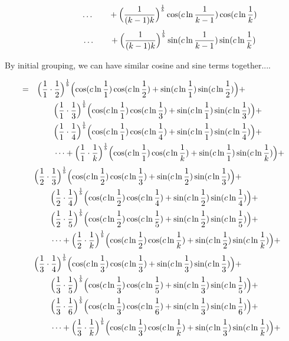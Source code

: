\documentclass{amsart}
\begin{document}
	\[ \qquad\qquad \dots \qquad + \Bigl( \frac{1}{(k-1)k} \Bigr)^\frac1b \cos(c \ln \frac{1}{k-1}) \cos(c \ln \frac{1}{k}) \]
	\[ \qquad\qquad \dots \qquad + \Bigl( \frac{1}{(k-1)k} \Bigr)^\frac1b \sin(c \ln \frac{1}{k-1}) \sin(c \ln \frac{1}{k}) \]
	
	By initial grouping, we can have similar cosine and sine terms together....
	
	\[
	\begin{aligned}
		= \quad & \Bigl( \frac{1}{1} \cdot \frac{1}{2} \Bigr)^\frac1b \Bigl( \cos(c \ln \frac{1}{1}) \cos(c \ln \frac{1}{2}) + \sin(c \ln \frac{1}{1}) \sin(c \ln \frac{1}{2}) \Bigr) + \\
		& \qquad \Bigl( \frac{1}{1} \cdot \frac{1}{3} \Bigr)^\frac1b \Bigl( \cos(c \ln \frac{1}{1}) \cos(c \ln \frac{1}{3}) + \sin(c \ln \frac{1}{1}) \sin(c \ln \frac{1}{3}) \Bigr) + \\
		& \qquad \Bigl( \frac{1}{1} \cdot \frac{1}{4} \Bigr)^\frac1b \Bigl( \cos(c \ln \frac{1}{1}) \cos(c \ln \frac{1}{4}) + \sin(c \ln \frac{1}{1}) \sin(c \ln \frac{1}{4}) \Bigr) + \\
		& \qquad \dots  + \Bigl( \frac{1}{1} \cdot \frac{1}{k} \Bigr)^\frac1b \Bigl( \cos(c \ln \frac{1}{1}) \cos(c \ln \frac{1}{k}) + \sin(c \ln \frac{1}{1}) \sin(c \ln \frac{1}{k}) \Bigr) + 
	\end{aligned}
	\]
	\[
	\begin{aligned}
		\quad & \Bigl( \frac{1}{2} \cdot \frac{1}{3} \Bigr)^\frac1b \Bigl( \cos(c \ln \frac{1}{2}) \cos(c \ln \frac{1}{3}) + \sin(c \ln \frac{1}{2}) \sin(c \ln \frac{1}{3}) \Bigr) + \\
		& \qquad \Bigl( \frac{1}{2} \cdot \frac{1}{4} \Bigr)^\frac1b \Bigl( \cos(c \ln \frac{1}{2}) \cos(c \ln \frac{1}{4}) + \sin(c \ln \frac{1}{2}) \sin(c \ln \frac{1}{4}) \Bigr) + \\
		& \qquad \Bigl( \frac{1}{2} \cdot \frac{1}{5} \Bigr)^\frac1b \Bigl( \cos(c \ln \frac{1}{2}) \cos(c \ln \frac{1}{5}) + \sin(c \ln \frac{1}{2}) \sin(c \ln \frac{1}{5}) \Bigr) + \\
		& \qquad \dots  + \Bigl( \frac{1}{2} \cdot \frac{1}{k} \Bigr)^\frac1b \Bigl( \cos(c \ln \frac{1}{2}) \cos(c \ln \frac{1}{k}) + \sin(c \ln \frac{1}{2}) \sin(c \ln \frac{1}{k}) \Bigr) + 
	\end{aligned}
	\]
	\[
	\begin{aligned}
		\quad & \Bigl( \frac{1}{3} \cdot \frac{1}{4} \Bigr)^\frac1b \Bigl( \cos(c \ln \frac{1}{3}) \cos(c \ln \frac{1}{3}) + \sin(c \ln \frac{1}{3}) \sin(c \ln \frac{1}{3}) \Bigr) + \\
		& \qquad \Bigl( \frac{1}{3} \cdot \frac{1}{5} \Bigr)^\frac1b \Bigl( \cos(c \ln \frac{1}{3}) \cos(c \ln \frac{1}{5}) + \sin(c \ln \frac{1}{3}) \sin(c \ln \frac{1}{5}) \Bigr) + \\
		& \qquad \Bigl( \frac{1}{3} \cdot \frac{1}{6} \Bigr)^\frac1b \Bigl( \cos(c \ln \frac{1}{3}) \cos(c \ln \frac{1}{6}) + \sin(c \ln \frac{1}{3}) \sin(c \ln \frac{1}{6}) \Bigr) + \\
		& \qquad \dots  + \Bigl( \frac{1}{3} \cdot \frac{1}{k} \Bigr)^\frac1b \Bigl( \cos(c \ln \frac{1}{3}) \cos(c \ln \frac{1}{k}) + \sin(c \ln \frac{1}{3}) \sin(c \ln \frac{1}{k}) \Bigr) + 
	\end{aligned}
	\]
\end{document}

